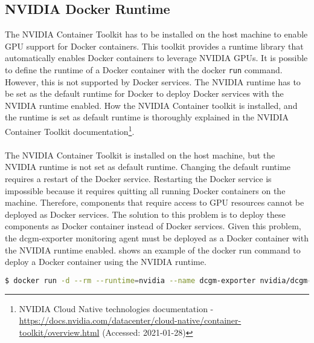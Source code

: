 \subsection{NVIDIA Docker Runtime}
The NVIDIA Container Toolkit has to be installed on the host machine to enable GPU support for Docker containers. This toolkit provides a runtime library that automatically enables Docker containers to leverage NVIDIA GPUs.
It is possible to define the runtime of a Docker container with the docker \texttt{run} command. However, this is not supported by Docker services. The NVIDIA runtime has to be set as the default runtime for Docker to deploy Docker services with the NVIDIA runtime enabled.
How the NVIDIA Container toolkit is installed, and the runtime is set as default runtime is thoroughly explained in the NVIDIA Container Toolkit documentation\footnote{NVIDIA Cloud Native technologies documentation - \url{https://docs.nvidia.com/datacenter/cloud-native/container-toolkit/overview.html} (Accessed: 2021-01-28)}.

\paragraph{}
The NVIDIA Container Toolkit is installed on the host machine, but the NVIDIA runtime is not set as default runtime.
Changing the default runtime requires a restart of the Docker service. Restarting the Docker service is impossible because it requires quitting all running Docker containers on the machine. Therefore, components that require access to GPU resources cannot be deployed as Docker services.
The solution to this problem is to deploy these components as Docker container instead of Docker services.
Given this problem, the dcgm-exporter monitoring agent must be deployed as a Docker container with the NVIDIA runtime enabled.
 shows an example of the docker run command to deploy a Docker container using the NVIDIA runtime.
\begin{lstlisting}[label=lst:06_impl-env_prob_cmd, caption=Docker run command to deploy a container using the NVIDIA runtime, language=sh, numbers=none]
$ docker run -d --rm --runtime=nvidia --name dcgm-exporter nvidia/dcgm-exporter:latest
\end{lstlisting}



